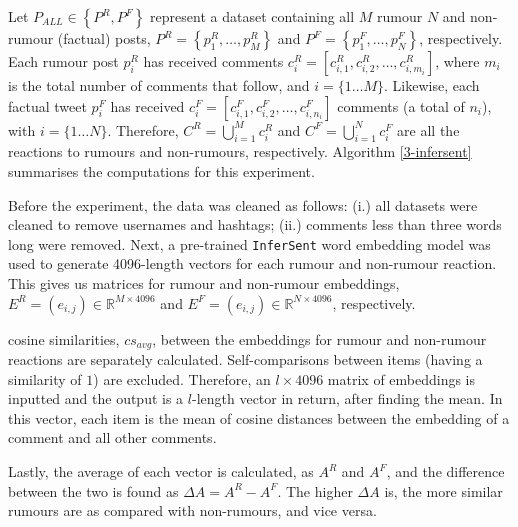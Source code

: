 Let $P_{ALL} \in \left\{ P^R, P^F \right\}$ represent a dataset containing all $M$ rumour $N$ and non-rumour (factual) posts, $P^R = \left\{ p_1^R, \ldots, p_M^R \right\}$ and $P^F = \left\{ p_1^F, \ldots, p_N^F \right\}$, respectively. Each rumour post $p_i^R$ has received comments $c_i^R = \left[c_{i,1}^R, c_{i,2}^R , \ldots, c_{i,m_i}^R \right]$, where $m_i$ is the total number of comments that follow, and $i = \{1 \ldots M\}$. Likewise, each factual tweet $p_i^F$ has received $c_i^F = \left[c_{i,1}^F, c_{i,2}^F, \ldots, c_{i,n_i}^F \right]$ comments (a total of $n_i$), with $i = \{1 \ldots N\}$. Therefore, $C^R = \bigcup\limits_{i=1}^M c_i^R$ and $C^F = \bigcup\limits_{i=1}^N c_i^F$ are all the reactions to rumours and non-rumours, respectively. Algorithm \autoref{3-infersent} summarises the computations for this experiment.

Before the experiment, the data was cleaned as follows: (i.) all datasets were cleaned to remove usernames and hashtags; (ii.) comments less than three words long were removed. Next, a	pre-trained \texttt{InferSent} word embedding model was used to generate 4096-length vectors for each rumour and non-rumour reaction. This gives us matrices for rumour and non-rumour embeddings, $E^R = (e_{i,j}) \in \mathbb{R}^{M \times 4096}$ and $E^F = (e_{i,j}) \in \mathbb{R}^{N \times 4096}$, respectively.

 cosine similarities, $cs_{avg}$, between the embeddings for rumour and non-rumour reactions are separately calculated. Self-comparisons between items (having a similarity of $1$) are excluded. Therefore, an $l \times 4096$ matrix of embeddings is inputted and the output is a $l$-length vector in return, after finding the mean. In this vector, each item is the mean of cosine distances between the embedding of a comment and all other comments.

Lastly, the average of each vector is calculated, as $A^R$ and $A^F$, and the difference between the two is found as $\Delta A = A^R - A^F$. The higher $\Delta A$ is, the more similar rumours are as compared with non-rumours, and vice versa.

